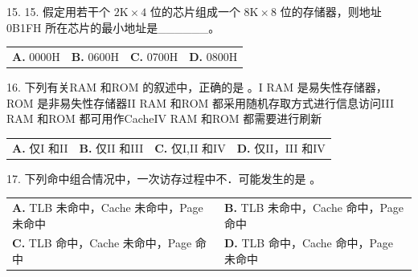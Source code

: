 \documentclass[UTF8,11pt]{ctexart}
\begin{document}
15. 15. 假定用若干个 \(\displaystyle 2\mathrm{K}\times4\) 位的芯片组成一个 \(\displaystyle 8\mathrm{K}\times8\) 位的存储器，则地址 0B1FH 所在芯片的最小地址是\_\_\_\_\_\_。


\begin{center}\begin{tabular}{>{\raggedright\arraybackslash}p{\dimexpr(\linewidth-8\tabcolsep)/4\relax}>{\raggedright\arraybackslash}p{\dimexpr(\linewidth-8\tabcolsep)/4\relax}>{\raggedright\arraybackslash}p{\dimexpr(\linewidth-8\tabcolsep)/4\relax}>{\raggedright\arraybackslash}p{\dimexpr(\linewidth-8\tabcolsep)/4\relax}}
\textbf{A.} 0000H & \textbf{B.} 0600H & \textbf{C.} 0700H & \textbf{D.} 0800H\\[.35em]\end{tabular}\end{center}

16. 下列有关RAM 和ROM 的叙述中，正确的是 。I RAM 是易失性存储器，ROM 是非易失性存储器II RAM 和ROM 都采用随机存取方式进行信息访问III RAM 和ROM 都可用作CacheIV RAM 和ROM 都需要进行刷新


\begin{center}\begin{tabular}{>{\raggedright\arraybackslash}p{\dimexpr(\linewidth-8\tabcolsep)/4\relax}>{\raggedright\arraybackslash}p{\dimexpr(\linewidth-8\tabcolsep)/4\relax}>{\raggedright\arraybackslash}p{\dimexpr(\linewidth-8\tabcolsep)/4\relax}>{\raggedright\arraybackslash}p{\dimexpr(\linewidth-8\tabcolsep)/4\relax}}
\textbf{A.} 仅I 和II & \textbf{B.} 仅II 和III & \textbf{C.} 仅I,II 和IV & \textbf{D.} 仅II，III 和IV\\[.35em]\end{tabular}\end{center}

17. 下列命中组合情况中，一次访存过程中不．可能发生的是 。


\begin{center}\begin{tabular}{>{\raggedright\arraybackslash}p{\dimexpr(\linewidth-4\tabcolsep)/2\relax}>{\raggedright\arraybackslash}p{\dimexpr(\linewidth-4\tabcolsep)/2\relax}}
\textbf{A.} TLB 未命中，Cache 未命中，Page 未命中 & \textbf{B.} TLB 未命中，Cache 命中，Page 命中\\[.35em]
\textbf{C.} TLB 命中，Cache 未命中，Page 命中 & \textbf{D.} TLB 命中，Cache 命中，Page 未命中\\[.35em]\end{tabular}\end{center}
\end{document}
